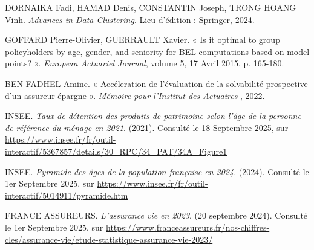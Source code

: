 \newpage %


\begin{thebibliography}{9}



DORNAIKA Fadi, HAMAD Denis, CONSTANTIN Joseph, TRONG HOANG Vinh. \textit{Advances in Data Clustering}. Lieu d'édition : Springer, 2024.

GOFFARD Pierre-Olivier, GUERRAULT Xavier. « Is it optimal to group policyholders by age, gender, and seniority for BEL computations based on model points? ». \textit{European Actuariel Journal}, volume 5, 17 Avril 2015, p. 165-180.


BEN FADHEL Amine. « Accéleration de l'évaluation de la solvabilité prospective d'un assureur épargne ». \textit{Mémoire pour l'Institut des Actuaires }, 2022.

INSEE. \textit{Taux de détention des produits de patrimoine selon l'âge de la personne de référence du ménage en 2021}. (2021). Consulté le 18 Septembre 2025, sur \url{https://www.insee.fr/fr/outil-interactif/5367857/details/30_RPC/34_PAT/34A_Figure1}

INSEE. \textit{Pyramide des âges de la population française en 2024}. (2024). Consulté le 1er Septembre 2025, sur \url{https://www.insee.fr/fr/outil-interactif/5014911/pyramide.htm}

FRANCE ASSUREURS. \textit{L'assurance vie en 2023}. (20 septembre 2024). Consulté le 1er Septembre 2025, sur \url{https://www.franceassureurs.fr/nos-chiffres-cles/assurance-vie/etude-statistique-assurance-vie-2023/}


\end{thebibliography}